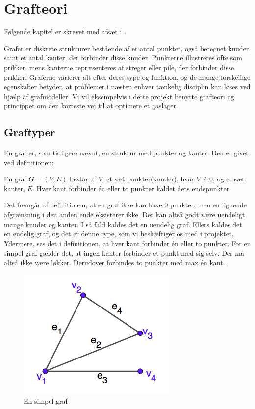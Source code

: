 \chapter{Grafteori}
Følgende kapitel er skrevet med afsæt i \citep{dmat}.

Grafer er diskrete strukturer bestående af et antal punkter, også betegnet knuder, samt et antal kanter, der forbinder disse knuder. Punkterne illustreres ofte som prikker, mens kanterne repræsenteres af streger eller pile, der forbinder disse prikker. Graferne varierer alt efter deres type og funktion, og de mange forskellige egenskaber betyder, at problemer i næsten enhver tænkelig disciplin kan løses ved hjælp af grafmodeller. Vi vil eksempelvis i dette projekt benytte grafteori og princippet om den korteste vej til at optimere et gaslager.
\section{Graftyper}
En graf er, som tidligere nævnt, en struktur med punkter og kanter. Den er givet ved definitionen:
\begin{definition}
[Graf] 
En graf $G=(V,E)$ består af $V$, et sæt punkter(knuder), hvor $V\neq0$, og et sæt kanter, $E$. Hver kant forbinder én eller to punkter kaldet dets endepunkter.
\end{definition}
Det fremgår af definitionen, at en graf ikke kan have 0 punkter, men en lignende afgrænsning i den anden ende eksisterer ikke. Der kan altså godt være uendeligt mange knuder og kanter. I så fald kaldes det en uendelig graf. Ellers kaldes det en endelig graf, og det er denne type, som vi beskæftiger os med i projektet.
Ydermere, ses det i definitionen, at hver kant forbinder én eller to punkter. For en simpel graf gælder det, at ingen kanter forbinder et punkt med sig selv. Der må altså ikke være løkker. Derudover forbindes to punkter med max én kant.
\begin{figure}[H]
\centering
\includegraphics[scale=0.5]{fig/img/simpel_graf.png}
\caption{En simpel graf}
\label{fig:simpel}
\end{figure}
